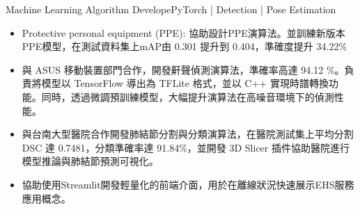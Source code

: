 \begin{cventries}
{\begin{cvitems}
\begin{itemize}
        \end{itemize}
        \item{Machine Learning Algorithm Develope}{}{PyTorch | Detection | Pose Estimation}
        \begin{itemize}
            \item Protective personal equipment (PPE): 協助設計PPE演算法。並訓練新版本PPE模型，在測試資料集上mAP由 0.301 提升到 0.404，準確度提升 34.22\%
        \end{itemize}
        \begin{itemize}
            \item 與 ASUS 移動裝置部門合作，開發鼾聲偵測演算法，準確率高達 94.12 \%。負責將模型以 TensorFlow 導出為 TFLite 格式，並以 C++ 實現時譜轉換功能。同時，透過微調預訓練模型，大幅提升演算法在高噪音環境下的偵測性能。
        \end{itemize}
        \begin{itemize}
            \item 與台南大型醫院合作開發肺結節分割與分類演算法，在醫院測試集上平均分割 DSC 達 0.7481，分類準確率達 91.84\%，並開發 3D Slicer 插件協助醫院進行模型推論與肺結節預測可視化。
        \end{itemize}
        \begin{itemize}
            \item 協助使用Streamlit開發輕量化的前端介面，用於在離線狀況快速展示EHS服務應用概念。
        \end{itemize}
      \end{cvitems}
    }


\end{cventries}
